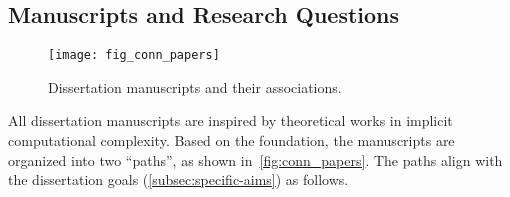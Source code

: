 
\subsection{Manuscripts and Research Questions}
\label{subsec:conn-papers}

\begin{figure}[p]
\texttt{[image: fig\_conn\_papers]}\vspace{1em}
\caption[Dissertation manuscripts and their associations]
{Dissertation manuscripts and their associations.}
\label{fig:conn_papers}
\end{figure}

All dissertation manuscripts are inspired by theoretical works in implicit computational complexity.
Based on the foundation, the manuscripts are organized into two \enquote{paths}, as shown in~\autoref{fig:conn_papers}.
The paths align with the dissertation goals (\autoref{subsec:specific-aims}) as follows.

